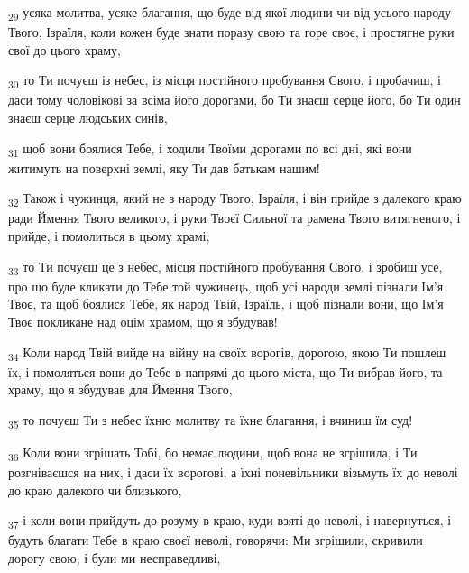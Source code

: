 \begin{tcolorbox}
\textsubscript{29} усяка молитва, усяке благання, що буде від якої людини чи від усього народу Твого, Ізраїля, коли кожен буде знати поразу свою та горе своє, і простягне руки свої до цього храму,
\end{tcolorbox}
\begin{tcolorbox}
\textsubscript{30} то Ти почуєш із небес, із місця постійного пробування Свого, і пробачиш, і даси тому чоловікові за всіма його дорогами, бо Ти знаєш серце його, бо Ти один знаєш серце людських синів,
\end{tcolorbox}
\begin{tcolorbox}
\textsubscript{31} щоб вони боялися Тебе, і ходили Твоїми дорогами по всі дні, які вони житимуть на поверхні землі, яку Ти дав батькам нашим!
\end{tcolorbox}
\begin{tcolorbox}
\textsubscript{32} Також і чужинця, який не з народу Твого, Ізраїля, і він прийде з далекого краю ради Ймення Твого великого, і руки Твоєї Сильної та рамена Твого витягненого, і прийде, і помолиться в цьому храмі,
\end{tcolorbox}
\begin{tcolorbox}
\textsubscript{33} то Ти почуєш це з небес, місця постійного пробування Свого, і зробиш усе, про що буде кликати до Тебе той чужинець, щоб усі народи землі пізнали Ім'я Твоє, та щоб боялися Тебе, як народ Твій, Ізраїль, і щоб пізнали вони, що Ім'я Твоє покликане над оцім храмом, що я збудував!
\end{tcolorbox}
\begin{tcolorbox}
\textsubscript{34} Коли народ Твій вийде на війну на своїх ворогів, дорогою, якою Ти пошлеш їх, і помоляться вони до Тебе в напрямі до цього міста, що Ти вибрав його, та храму, що я збудував для Ймення Твого,
\end{tcolorbox}
\begin{tcolorbox}
\textsubscript{35} то почуєш Ти з небес їхню молитву та їхнє благання, і вчиниш їм суд!
\end{tcolorbox}
\begin{tcolorbox}
\textsubscript{36} Коли вони згрішать Тобі, бо немає людини, щоб вона не згрішила, і Ти розгніваєшся на них, і даси їх ворогові, а їхні поневільники візьмуть їх до неволі до краю далекого чи близького,
\end{tcolorbox}
\begin{tcolorbox}
\textsubscript{37} і коли вони прийдуть до розуму в краю, куди взяті до неволі, і навернуться, і будуть благати Тебе в краю своєї неволі, говорячи: Ми згрішили, скривили дорогу свою, і були ми несправедливі,
\end{tcolorbox}

